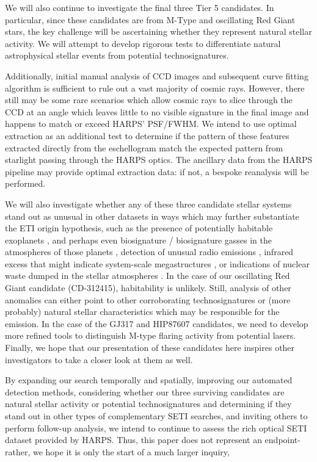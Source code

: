 \documentclass[twocolumn]{aastex701}
\begin{document}
We will also continue to investigate the final three Tier 5 candidates. In particular, since these candidates are from M-Type and oscillating Red Giant stars, the key challenge will be ascertaining whether they represent natural stellar activity. We will attempt to develop rigorous tests to differentiate natural astrophysical stellar events from potential technosignatures. 

Additionally, initial manual analysis of CCD images and subsequent curve fitting algorithm is sufficient to rule out a vast majority of cosmic rays. However, there still may be some rare scenarios which allow cosmic rays to slice through the CCD at an angle which leaves little to no visible signature in the final image and happens to match or exceed HARPS' PSF/FWHM. We intend to use optimal extraction \citep{horne86optimal_extraction} as an additional test to determine if the pattern of these features extracted directly from the eschellogram  match the expected pattern from starlight passing through the HARPS optics. The ancillary data from the HARPS pipeline \citep{HARPS_specs} may provide optimal extraction data: if not, a bespoke reanalysis will be performed. 

We will also investigate whether any of these three candidate stellar systems stand out as unusual in other datasets in ways which may further substantiate the ETI origin hypothesis, such as the presence of potentially habitable exoplanets \citep{exoplanets}, and perhaps even biosignature / biosignature gasses in the atmospheres of those planets \citep{exoplanetbiosignatures,HAQQMISRA2022194}, detection of unusual radio emissions \citep{BACKUS1998651}, infrared excess that might indicate system-scale megastructures \citep{dysonspheres,TILGNER1998607}, or indications of nuclear waste dumped in the stellar atmospheres \citep{WHITMIRE1980149}. In the case of our oscillating Red Giant candidate (CD-312415), habitability is  unlikely. Still, analysis of other anomalies can either point to other corroborating technosignatures or (more probably) natural stellar characteristics which may be responsible for the emission. In the case of the GJ317 and HIP87607 candidates, we need to develop more refined tools to distinguish M-type flaring activity from potential lasers. Finally, we hope that our presentation of these candidates here inspires other investigators to take a closer look at them as well.

By expanding our search temporally and spatially, improving our automated detection methods, considering whether our three surviving candidates are natural stellar activity or potential technosignatures and determining if they stand out in other types of complementary SETI searches, and inviting others to perform follow-up analysis, we intend to continue to assess the rich optical SETI dataset provided by HARPS. Thus, this paper does not represent an endpoint-rather, we hope it is only the start of a much larger inquiry,
\end{document}
